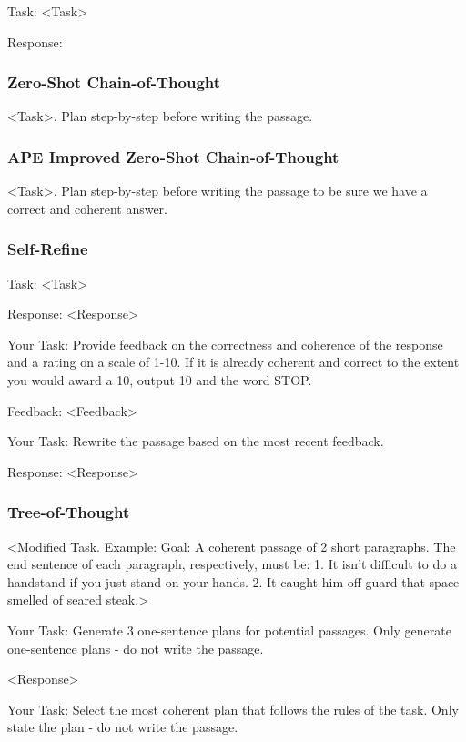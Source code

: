 \documentclass[11pt]{article}
\begin{document}
Task: <Task>

Response: 

\subsubsection*{Zero-Shot Chain-of-Thought}

<Task>. Plan step-by-step before writing the passage.

\subsubsection*{APE Improved Zero-Shot Chain-of-Thought}

<Task>. Plan step-by-step before writing the passage to be sure we have a correct and coherent answer.

\subsubsection*{Self-Refine}

Task: <Task>

Response: <Response>

Your Task: Provide feedback on the correctness and coherence of the response and a rating on a scale of 1-10. If it is already coherent and correct to the extent you would award a 10, output 10 and the word STOP.

Feedback: <Feedback>

Your Task: Rewrite the passage based on the most recent feedback.

Response: <Response>

\subsubsection*{Tree-of-Thought}

<Modified Task. Example: Goal: A coherent passage of 2 short paragraphs. The end sentence of each paragraph, respectively, must be: 1. It isn't difficult to do a handstand if you just stand on your hands. 2. It caught him off guard that space smelled of seared steak.>

Your Task: Generate 3 one-sentence plans for potential passages. Only generate one-sentence plans - do not write the passage.

<Response>

Your Task: Select the most coherent plan that follows the rules of the task. Only state the plan - do not write the passage.
\end{document}

